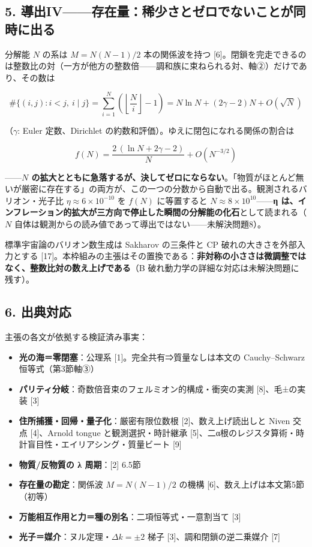 \documentclass[
  a4paper,
]{ltjsarticle}
\providecommand{\tightlist}{%
  \setlength{\itemsep}{0pt}\setlength{\parskip}{0pt}}
\begin{document}
\subsection{5.
導出IV------存在量：稀少さとゼロでないことが同時に出る}\label{ux5c0eux51faivux5b58ux5728ux91cfux7a00ux5c11ux3055ux3068ux30bcux30edux3067ux306aux3044ux3053ux3068ux304cux540cux6642ux306bux51faux308b}

分解能 \(N\) の系は \(M=N(N-1)/2\) 本の関係波を持つ
{[}6{]}。閉鎖を完走できるのは整数比の対（一方が他方の整数倍------調和族に束ねられる対、軸②）だけであり、その数は

\[
\#\{(i,j):i<j,\ i\mid j\}=\sum_{i=1}^{N}\left(\left\lfloor\frac{N}{i}\right\rfloor-1\right)=N\ln N+(2\gamma-2)N+O(\sqrt N)
\]

（\(\gamma\): Euler 定数、Dirichlet
の約数和評価）。ゆえに閉包になれる関係の割合は

\[
f(N)=\frac{2\,(\ln N+2\gamma-2)}{N}+O(N^{-3/2})
\]

------\textbf{\(N\)
の拡大とともに急落するが、決してゼロにならない}。「物質がほとんど無いが厳密に存在する」の両方が、この一つの分数から自動で出る。観測されるバリオン・光子比
\(\eta\approx6\times10^{-10}\) を \(f(N)\) に等置すると
\(N\approx8\times10^{10}\)------\textbf{η
は、インフレーション的拡大が三方向で停止した瞬間の分解能の化石}として読まれる（\(N\)
自体は観測からの読み値であって導出ではない------未解決問題8）。

標準宇宙論のバリオン数生成は Sakharov の三条件と CP
破れの大きさを外部入力とする
{[}17{]}。本枠組みの主張はその置換である：\textbf{非対称の小ささは微調整ではなく、整数比対の数え上げである}（B
破れ動力学の詳細な対応は未解決問題に残す）。

\subsection{6. 出典対応}\label{ux51faux5178ux5bfeux5fdc}

主張の各文が依拠する検証済み事実：

\begin{itemize}
\tightlist
\item
  \textbf{光の海＝零閉塞}：公理系 {[}1{]}。完全共有⇒質量なしは本文の
  Cauchy--Schwarz 恒等式（第3節軸③）
\item
  \textbf{パリティ分岐}：奇数倍音束のフェルミオン的構成・衝突の実測
  {[}8{]}、毛±の実装 {[}3{]}
\item
  \textbf{住所捕獲・回帰・量子化}：厳密有限位数根
  {[}2{]}、数え上げ読出しと Niven 交点 {[}4{]}、Arnold tongue
  と観測選択・時計継承
  {[}5{]}、二α根のレジスタ算術・時計盲目性・エイリアシング・質量ビート
  {[}9{]}
\item
  \textbf{物質/反物質の λ 周期}：{[}2{]} 6.5節
\item
  \textbf{存在量の勘定}：関係波 \(M=N(N-1)/2\) の機構
  {[}6{]}、数え上げは本文第5節（初等）
\item
  \textbf{万能相互作用と力＝種の別名}：二項恒等式・一意割当て {[}3{]}
\item
  \textbf{光子＝媒介}：ヌル定理・\(\Delta k=\pm2\) 梯子
  {[}3{]}、調和閉鎖の逆二乗媒介 {[}7{]}
\end{itemize}
\end{document}

